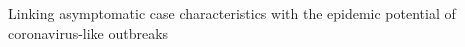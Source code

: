 Linking asymptomatic case characteristics with the epidemic potential of coronavirus-like outbreaks
